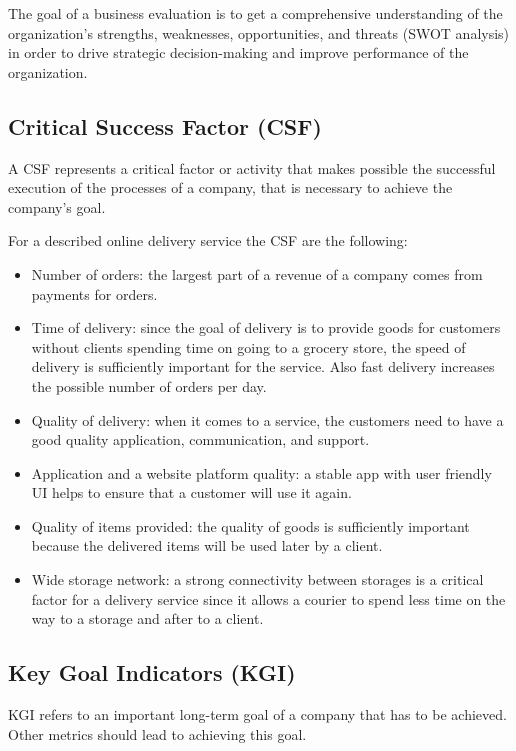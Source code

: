 The goal of a business evaluation is to get a comprehensive understanding of the organization's
strengths, weaknesses, opportunities, and threats (SWOT analysis)
in order to drive strategic decision-making and improve performance of the organization. 

\subsection{Critical Success Factor (CSF)}

A CSF represents a critical factor or activity that makes possible the successful execution of the processes of a company,
that is necessary to achieve the company's goal.

For a described online delivery service the CSF are the following:

\begin{itemize}
    \item Number of orders: the largest part of a revenue of a company comes from payments for orders.
    \item Time of delivery: since the goal of delivery is to provide goods for customers without clients spending time on going to a grocery store, the speed of delivery is sufficiently important for the service. Also fast delivery increases the possible number of orders per day.
    \item Quality of delivery: when it comes to a service, the customers need to have a good quality application, communication, and support.
    \item Application and a website platform quality: a stable app with user friendly UI helps to ensure that a customer will use it again.
    \item Quality of items provided: the quality of goods is sufficiently important because the delivered items will be used later by a client.
    \item Wide storage network: a strong connectivity between storages is a critical factor for a delivery service since it allows a courier to spend less time on the way to a storage and after to a client.
\end{itemize}

\subsection{Key Goal Indicators (KGI)}

KGI refers to an important long-term goal of a company that has to be achieved. Other metrics should lead to achieving this goal.

